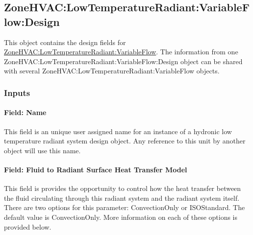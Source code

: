 \subsection{ZoneHVAC:LowTemperatureRadiant:VariableFlow:Design}\label{zonehvaclowtemperatureradiantvariableflowdesign}

This object contains the design fields for \hyperref[zonehvaclowtemperatureradiantvariableflow]{ZoneHVAC:LowTemperatureRadiant:VariableFlow}.
The information from one ZoneHVAC:LowTemperatureRadiant:VariableFlow:Design object can be shared with several ZoneHVAC:LowTemperatureRadiant:VariableFlow objects.

\subsubsection{Inputs}

\paragraph{Field: Name}\label{hydrDesignObj}

This field is an unique user assigned name for an instance of a hydronic low temperature radiant system design object. Any reference to this unit by another object will use this name.

\paragraph{Field: Fluid to Radiant Surface Heat Transfer Model}\label{field-fluid-to-radiant-surface-heat-transfer-model-000}

This field is provides the opportunity to control how the heat transfer between the fluid circulating through this radiant system and the radiant system itself.  There are two options for this parameter: ConvectionOnly or ISOStandard.  The default value is ConvectionOnly.  More information on each of these options is provided below.

